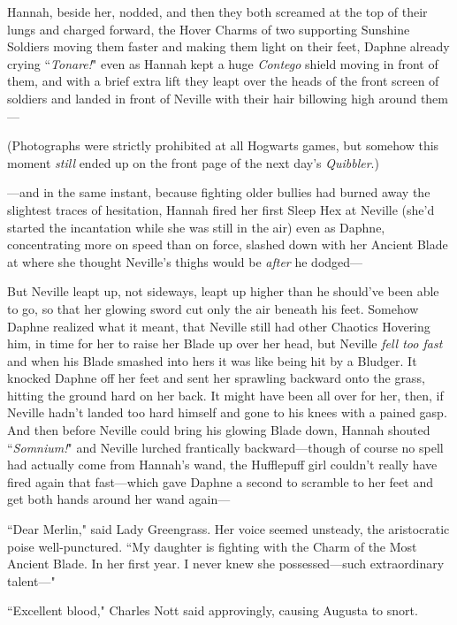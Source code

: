 Hannah, beside her, nodded, and then they both screamed at the top of their lungs and charged forward, the Hover Charms of two supporting Sunshine Soldiers moving them faster and making them light on their feet, Daphne already crying ``\emph{Tonare!}" even as Hannah kept a huge \emph{Contego} shield moving in front of them, and with a brief extra lift they leapt over the heads of the front screen of soldiers and landed in front of Neville with their hair billowing high around them—

(Photographs were strictly prohibited at all Hogwarts games, but somehow this moment \emph{still} ended up on the front page of the next day's \emph{Quibbler}.)

—and in the same instant, because fighting older bullies had burned away the slightest traces of hesitation, Hannah fired her first Sleep Hex at Neville (she'd started the incantation while she was still in the air) even as Daphne, concentrating more on speed than on force, slashed down with her Ancient Blade at where she thought Neville's thighs would be \emph{after} he dodged—

But Neville leapt up, not sideways, leapt up higher than he should've been able to go, so that her glowing sword cut only the air beneath his feet. Somehow Daphne realized what it meant, that Neville still had other Chaotics Hovering him, in time for her to raise her Blade up over her head, but Neville \emph{fell too fast} and when his Blade smashed into hers it was like being hit by a Bludger. It knocked Daphne off her feet and sent her sprawling backward onto the grass, hitting the ground hard on her back. It might have been all over for her, then, if Neville hadn't landed too hard himself and gone to his knees with a pained gasp. And then before Neville could bring his glowing Blade down, Hannah shouted ``\emph{Somnium!}" and Neville lurched frantically backward—though of course no spell had actually come from Hannah's wand, the Hufflepuff girl couldn't really have fired again that fast—which gave Daphne a second to scramble to her feet and get both hands around her wand again—

\later

``Dear Merlin," said Lady Greengrass. Her voice seemed unsteady, the aristocratic poise well-punctured. ``My daughter is fighting with the Charm of the Most Ancient Blade. In her first year. I never knew she possessed—such extraordinary talent—"

``Excellent blood," Charles Nott said approvingly, causing Augusta to snort.

